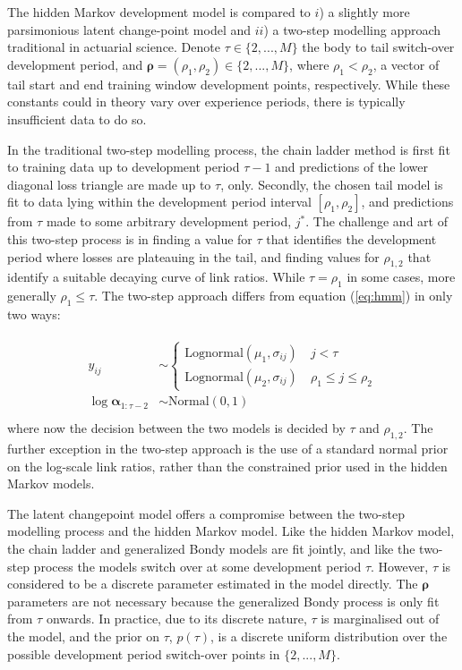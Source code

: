 The hidden Markov development model is compared to
$i$) a slightly more parsimonious latent change-point
model and $ii$) a two-step modelling approach traditional
in actuarial science.
Denote $\tau \in \{2, ..., M\}$ the body to tail
switch-over development period, and
$\bm{\rho} = (\rho_{1}, \rho_{2}) \in \{2, ..., M\}$,
where $\rho_{1} < \rho_{2}$,
a vector of tail start and end training window
development points, respectively.
While these constants could in theory vary over
experience periods, there is typically insufficient
data to do so.

In the traditional two-step modelling process,
the chain ladder
method is first fit to training data up
to development period $\tau - 1$ and
predictions of the lower diagonal loss
triangle are made up to $\tau$, only.
Secondly, the chosen tail model is fit to data
lying within the development period
interval $[\rho_{1}, \rho_{2}]$,
and predictions from $\tau$ made to 
some arbitrary development period, $j^{*}$.
The challenge and art of this two-step process
is in finding a value for $\tau$ that
identifies the development period where
losses are plateauing in the tail,
and finding values for $\rho_{1,2}$ that
identify a suitable decaying curve of link ratios.
While $\tau = \rho_{1}$ in some cases,
more generally $\rho_{1} \leq \tau$.
The two-step approach differs from
equation (\ref{eq:hmm}) in only two
ways:

\begin{align}
\begin{split}
	y_{ij} &\sim 
	\begin{cases}
		\mathrm{Lognormal}(\mu_{1}, \sigma_{ij}) \quad j < \tau\\
		\mathrm{Lognormal}(\mu_{2}, \sigma_{ij}) \quad \rho_{1} \leq j \leq \rho_{2}
	\end{cases}\\
	\log \bm{\alpha}_{1:\tau - 2} &\sim \mathrm{Normal}(0, 1)\\
\end{split}
\end{align}
%
where now the decision between the two
models is decided by $\tau$ and $\rho_{1,2}$.
The further exception in the two-step approach
is the use of a standard normal prior
on the log-scale link ratios, rather than the
constrained prior used in the hidden Markov models.

The latent changepoint model offers a compromise
between the two-step modelling process
and the hidden Markov model.
Like the hidden Markov model, the chain ladder
and generalized Bondy models are fit jointly, 
and like the two-step process the models
switch over at some development period
$\tau$. However,
$\tau$ is considered to be a
discrete parameter estimated
in the model directly.
The $\bm{\rho}$ parameters are not necessary
because the generalized Bondy process is
only fit from $\tau$ onwards.
In practice, due to its discrete nature,
$\tau$ is marginalised out of the model,
and the prior on $\tau$, $p(\tau)$,
is a discrete uniform distribution over the possible
development period switch-over points in $\{2,...,M\}$.

